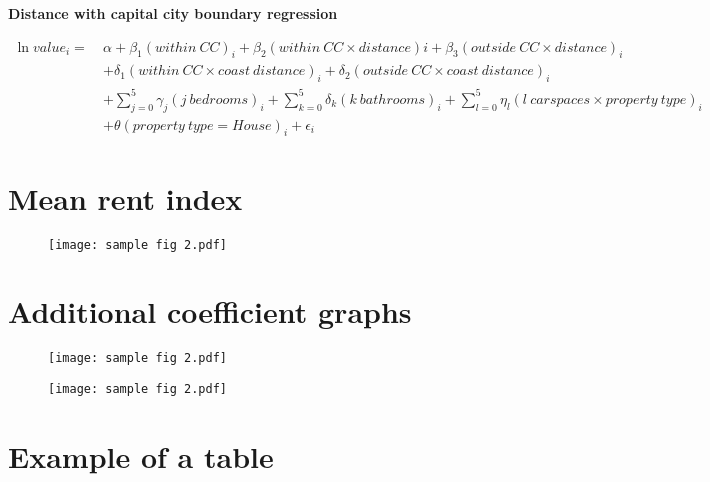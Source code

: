 \documentclass[10pt,openany,leqno]{e61-portrait-research-note}
\begin{document}
\textbf{Distance with capital city boundary regression}

\begin{equation}
\label{eq:dist}
    \begin{aligned}
        \ln{value_i} =\ &\alpha + \beta_1(within\ CC)_i + \beta_2(within\ CC \times distance)i + \beta_3(outside\ CC \times distance)_i \\ &+ 
        \delta_1(within\ CC \times coast\ distance)_i + \delta_2(outside\ CC \times coast\ distance)_i \\ &+ 
        \sum_{j=0}^5 \gamma_j (j\ bedrooms)_i + \sum_{k=0}^5 \delta_k (k\ bathrooms)_i + 
        \sum_{l=0}^5 \eta_l (l\ carspaces \times property\ type)_i \\ &+ \theta (property\ type = House)_i + \epsilon_i
    \end{aligned}
\end{equation}

\FloatBarrier
\section{Mean rent index}\label{app:rent-index}

\lipsum[1]

\begin{figure}[ht]
  \centering
  \caption{}\label{fig:rent-index}
  \texttt{[image: sample fig 2.pdf]}
\end{figure}

\FloatBarrier
\section{Additional coefficient graphs}

\lipsum[1]

\lipsum[2]

\begin{figure}[htb]
\centering
\begin{minipage}{.35\textwidth}
  \centering
  \texttt{[image: sample fig 2.pdf]}
  \label{fig:rent-bed}
\end{minipage}
\begin{minipage}{.35\textwidth}
  \centering
  \texttt{[image: sample fig 2.pdf]}
  \label{fig:rent-car}
\end{minipage}
\end{figure}

\FloatBarrier
\section{Example of a table}
\end{document}
